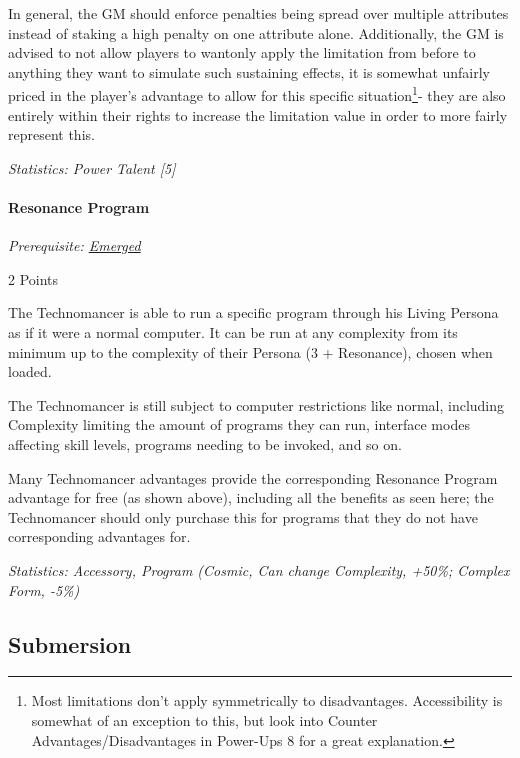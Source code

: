 \begin{multicols*}{3}
	In general, the GM should enforce penalties being spread over multiple attributes instead of staking a high penalty on one attribute alone. Additionally, the GM is advised to not allow players to wantonly apply the limitation from before to anything they want to simulate such sustaining effects, it is somewhat unfairly priced in the player's advantage to allow for this specific situation\footnote{Most limitations don't apply symmetrically to disadvantages. Accessibility is somewhat of an exception to this, but look into Counter Advantages/Disadvantages in Power-Ups 8 for a great explanation.}- they are also entirely within their rights to increase the limitation value in order to more fairly represent this.
	
	\textit{\textcolor{OliveGreen}{Statistics: Power Talent [5]}}
	
	\paragraph{Resonance Program}
	\textit{Prerequisite: \hyperref[emerged]{Emerged}}
	\begin{flushright}
		2 Points
	\end{flushright}

	The Technomancer is able to run a specific program through his Living Persona as if it were a normal computer. It can be run at any complexity from its minimum up to the complexity of their Persona (3 + Resonance), chosen when loaded.
	
	The Technomancer is still subject to computer restrictions like normal, including Complexity limiting the amount of programs they can run, interface modes affecting skill levels, programs needing to be invoked, and so on.
	
	Many Technomancer advantages provide the corresponding Resonance Program advantage for free (as shown above), including all the benefits as seen here; the Technomancer should only purchase this for programs that they do not have corresponding advantages for.

	\textit{\textcolor{OliveGreen}{Statistics: Accessory, Program (Cosmic, Can change Complexity, +50\%; Complex Form, -5\%) }}
	
	\subsection{Submersion}
	

\end{multicols*}
